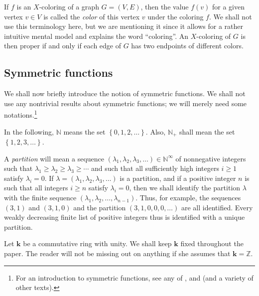 \documentclass[numbers=enddot,12pt,final,onecolumn,notitlepage]{scrartcl}%
\theoremstyle{definition}
\begin{document}
If $f$ is an $X$-coloring of a graph $G=\left(  V,E\right)  $, then the value
$f\left(  v\right)  $ for a given vertex $v\in V$ is called the \emph{color}
of this vertex $v$ under the coloring $f$. We shall not use this terminology
here, but we are mentioning it since it allows for a rather intuitive mental
model and explains the word \textquotedblleft coloring\textquotedblright. An
$X$-coloring of $G$ is then proper if and only if each edge of $G$ has two
endpoints of different colors.

\subsection{Symmetric functions}

We shall now briefly introduce the notion of symmetric functions. We shall not
use any nontrivial results about symmetric functions; we will merely need some
notations.\footnote{For an introduction to symmetric functions, see any of
\cite[Chapter 7]{Stanley-EC2}, \cite[Chapter 9]{Martin22} and \cite[Chapter
2]{Reiner} (and a variety of other texts).}

In the following, $\mathbb{N}$ means the set $\left\{  0,1,2,\ldots\right\}
$. Also, $\mathbb{N}_{+}$ shall mean the set $\left\{  1,2,3,\ldots\right\}  $.

A \emph{partition} will mean a sequence $\left(  \lambda_{1},\lambda
_{2},\lambda_{3},\ldots\right)  \in\mathbb{N}^{\infty}$ of nonnegative
integers such that $\lambda_{1}\geq\lambda_{2}\geq\lambda_{3}\geq\cdots$ and
such that all sufficiently high integers $i\geq1$ satisfy $\lambda_{i}=0$. If
$\lambda=\left(  \lambda_{1},\lambda_{2},\lambda_{3},\ldots\right)  $ is a
partition, and if a positive integer $n$ is such that all integers $i\geq n$
satisfy $\lambda_{i}=0$, then we shall identify the partition $\lambda$ with
the finite sequence $\left(  \lambda_{1},\lambda_{2},\ldots,\lambda
_{n-1}\right)  $. Thus, for example, the sequences $\left(  3,1\right)  $ and
$\left(  3,1,0\right)  $ and the partition $\left(  3,1,0,0,0,\ldots\right)  $
are all identified. Every weakly decreasing finite list of positive integers
thus is identified with a unique partition.

Let $\mathbf{k}$ be a commutative ring with unity. We shall keep $\mathbf{k}$
fixed throughout the paper. The reader will not be missing out on anything if
she assumes that $\mathbf{k}=\mathbb{Z}$.
\end{document}

